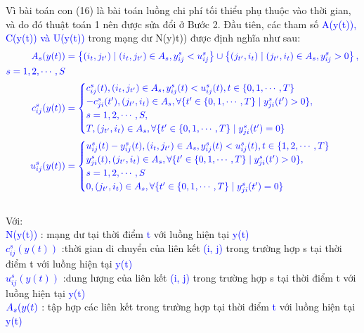 \documentclass[a4paper]{article}
\begin{document}
Vì bài toán con (16) là bài toán luồng chi phí tối thiểu phụ thuộc vào thời gian, và do đó thuật toán 1 nên được sửa đổi ở Bước 2. Đầu tiên, các tham số \textcolor{blue}{A(y(t)), C(y(t)) và U(y(t))} trong mạng dư N(y)t)) được định nghĩa như sau:  
\[
\textcolor{blue}{\begin{aligned}
A_s(y(t)) &= \left\{(i_t, j_{t'}) \mid (i_t, j_{t'}) \in A_s, y_{ij}^s < u_{ij}^s \right\} \cup \left\{(j_{t'}, i_t) \mid (j_{t'}, i_t) \in A_s, y_{ij}^s > 0 \right\}, \\
s= 1,2, \cdots, S \\
c_{ij}^s(y(t)) &=
\begin{cases}
c_{ij}^s(t),  (i_t, j_{t'}) \in A_s, y_{ij}^s(t) < u_{ij}^s(t), t \in \{0,1,\cdots,T\} \\
-c_{ji}^s(t'), (j_{t'}, i_t) \in A_s, \forall\{t' \in \{0,1,\cdots,T\} \mid y_{ji}^s(t') > 0\},\\
 s = 1,2, \cdots, S,\\
 T, (j_{t'}, i_t) \in A_s, \forall\{t' \in \{0,1,\cdots,T\} \mid y_{ji}^s(t') = 0\}
\end{cases} \\
u_{ij}^s(y(t)) &=
\begin{cases}
u_{ij}^s(t) - y_{ij}^s(t),  (i_t, j_{t'}) \in A_s, y_{ij}^s(t) < u_{ij}^s(t), t \in \{1,2,\cdots,T\} \\
y_{ji}^s(t),  (j_{t'}, i_t) \in A_s, \forall\{t' \in \{0,1,\cdots,T\} \mid y_{ji}^s(t') > 0\}, \\
s = 1,2, \cdots, S \\
0,(j_{t'}, i_t) \in A_s, \forall\{t' \in \{0,1,\cdots,T\} \mid y_{ji}^s(t') = 0\}
\end{cases}
\end{aligned}}
\]
\\
Với:\\
\textcolor{blue}{N(y(t))} : mạng dư tại thời điểm \textcolor{blue}{t} với luồng hiện tại \textcolor{blue}{y(t)} \\
\textcolor{blue}{$c_{ij}^s(y(t))$} :thời gian di chuyển của liên kết \textcolor{blue}{(i, j)}  trong trường hợp s tại thời điểm t với luồng hiện tại \textcolor{blue}{y(t)} \\
\textcolor{blue}{$u_{ij}^s(y(t))$} :dung lượng của liên kết \textcolor{blue}{(i, j)} trong trường hợp s tại thời điểm t với luồng hiện tại \textcolor{blue}{y(t)} \\
$\textcolor{blue}{A_{s}(y(t)}$ : tập hợp các liên kết trong trường hợp tại thời điểm \textcolor{blue}{t} với luồng hiện tại \textcolor{blue}{y(t)} \\
\end{document}
